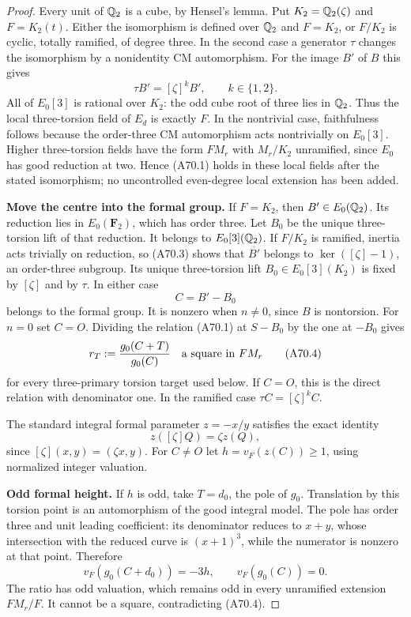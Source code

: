 \begin{proof}
Every unit of $\mathbb Q_2$ is a cube, by Hensel's
lemma. Put $K_2=\mathbb Q_2(\zeta)$ and $F=K_2(t)$.
Either the isomorphism is defined over
$\mathbb Q_2$ and $F=K_2$, or $F/K_2$ is cyclic,
totally ramified, of degree three. In the
second case a generator $\tau$ changes the
isomorphism by a nonidentity CM automorphism.
For the image $B'$ of $B$ this gives
\[
 \tau B'=[\zeta]^kB',\qquad k\in\{1,2\}.
 \tag{A70.3}
\]
All of $E_0[3]$ is rational over $K_2$:
the odd cube root of three lies in
$\mathbb Q_2$. Thus the local three-torsion
field of $E_d$ is exactly $F$.
In the nontrivial case, faithfulness follows
because the order-three CM automorphism
acts nontrivially on $E_0[3]$.
Higher three-torsion fields have the form
$FM_r$ with $M_r/K_2$ unramified, since
$E_0$ has good reduction at two. Hence
(A70.1) holds in these local fields after
the stated isomorphism; no uncontrolled
even-degree local extension has been added.

\par\smallskip\noindent\textbf{Move the centre into the formal group.}\enspace
If $F=K_2$, then $B'\in E_0(\mathbb Q_2)$.
Its reduction lies in $E_0(\mathbf F_2)$,
which has order three. Let $B_0$ be the
unique three-torsion lift of that reduction.
It belongs to $E_0[3](\mathbb Q_2)$.
If $F/K_2$ is ramified, inertia acts
trivially on reduction, so (A70.3) shows
that $\overline{B'}$ belongs to
$\ker([\zeta]-1)$, an order-three
subgroup. Its unique three-torsion lift
$B_0\in E_0[3](K_2)$ is fixed by
$[\zeta]$ and by $\tau$.
In either case
\[
 C=B'-B_0
\]
belongs to the formal group. It is nonzero
when $n\ne0$, since $B$ is nontorsion.
For $n=0$ set $C=O$.
Dividing the relation (A70.1) at $S-B_0$
by the one at $-B_0$ gives
\[
 r_T:=\frac{g_0(C+T)}{g_0(C)}
          \quad\hbox{a square in }FM_r
 \tag{A70.4}
\]
for every three-primary torsion target
used below. If $C=O$, this is the direct
relation with denominator one. In the
ramified case $\tau C=[\zeta]^k C$.

The standard integral formal parameter
$z=-x/y$ satisfies the exact identity
\[
 z([\zeta]Q)=\zeta z(Q),
 \tag{A70.5}
\]
since $[\zeta](x,y)=(\zeta x,y)$.
For $C\ne O$ let $h=v_F(z(C))\ge1$,
using normalized integer valuation.

\par\smallskip\noindent\textbf{Odd formal height.}\enspace
If $h$ is odd, take $T=d_0$, the pole
of $g_0$. Translation by this torsion
point is an automorphism of the good
integral model. The pole has order
three and unit leading coefficient:
its denominator reduces to $x+y$,
whose intersection with the reduced
curve is $(x+1)^3$, while the numerator
is nonzero at that point. Therefore
\[
 v_F(g_0(C+d_0))=-3h,\qquad
 v_F(g_0(C))=0.
\]
The ratio has odd valuation, which
remains odd in every unramified
extension $FM_r/F$. It cannot be a
square, contradicting (A70.4).


\end{proof}
